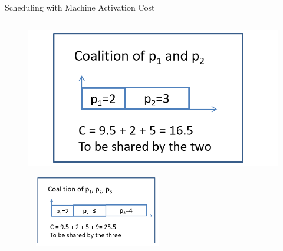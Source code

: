 \documentclass[14pt]{beamer}
\begin{document}
\begin{frame}{Scheduling with Machine Activation Cost}
\begin{columns}
  \begin{column}{6.5cm}
  \vspace{-5mm}
  \begin{figure}[H]
  \centering
  \includegraphics[width=1\textwidth]{Sche3.png}
  \end{figure}

  \vspace{-8mm}
  \begin{figure}[H]
  \centering
  \includegraphics[width=6.2cm, height=3.1cm]{Sche4.png}
  \end{figure}

  \end{column}

  \end{columns}

\end{frame}
\end{document}
